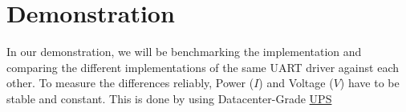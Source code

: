 \documentclass[../main.tex]{subfiles}
\begin{document}
    \clearpage
    \section{Demonstration}

    In our demonstration, we will be benchmarking the implementation and comparing the different implementations of the same UART driver against each other. To measure the differences reliably, Power ($I$) and Voltage ($V$) have to be stable and constant. This is done by using Datacenter-Grade \href{https://lenovopress.lenovo.com/lp1721-rt15kva-and-rt3kva-2u-rack-or-tower-uninterruptible-power-supplies-g2}{UPS}
\end{document}
